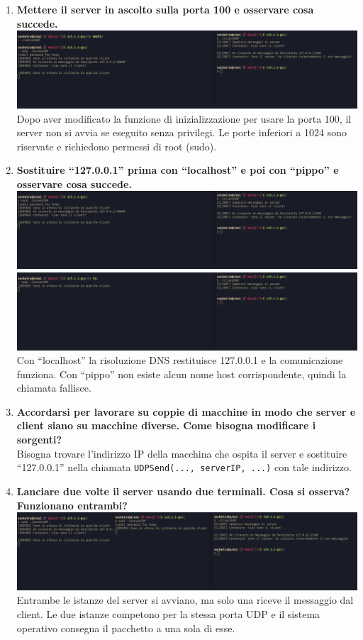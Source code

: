 \documentclass[a4paper,12pt]{article}
\begin{document}
\begin{enumerate}
  \item \textbf{Mettere il server in ascolto sulla porta 100 e osservare cosa succede.}\\
    \includegraphics[width=0.7\linewidth]{cambio_porta_server.png}\\
    Dopo aver modificato la funzione di inizializzazione per usare la porta 100, il server non si avvia se eseguito senza privilegi. Le porte inferiori a 1024 sono riservate e richiedono permessi di root (sudo).

  \item \textbf{Sostituire ``127.0.0.1'' prima con ``localhost'' e poi con ``pippo'' e osservare cosa succede.}\\
    \includegraphics[width=0.45\linewidth]{ip_localhost.png}
    \includegraphics[width=0.45\linewidth]{ip_pippo.png}\\
    Con ``localhost'' la risoluzione DNS restituisce 127.0.0.1 e la comunicazione funziona. Con ``pippo'' non esiste alcun nome host corrispondente, quindi la chiamata fallisce.

  \item \textbf{Accordarsi per lavorare su coppie di macchine in modo che server e client siano su macchine diverse. Come bisogna modificare i sorgenti?}\\
    Bisogna trovare l'indirizzo IP della macchina che ospita il server e sostituire ``127.0.0.1'' nella chiamata \texttt{UDPSend(..., serverIP, ...)} con tale indirizzo.

  \item \textbf{Lanciare due volte il server usando due terminali. Cosa si osserva? Funzionano entrambi?}\\
    \includegraphics[width=0.7\linewidth]{due_server.png}\\
    Entrambe le istanze del server si avviano, ma solo una riceve il messaggio dal client. Le due istanze competono per la stessa porta UDP e il sistema operativo consegna il pacchetto a una sola di esse.


\end{enumerate}
\end{document}
